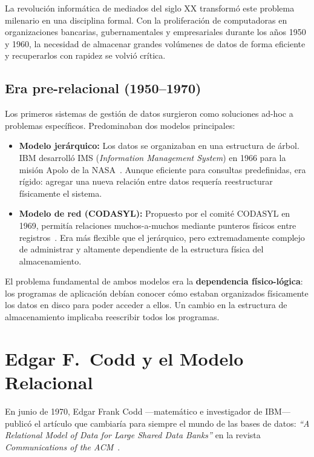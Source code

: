 \documentclass[12pt, a4paper]{article}
\begin{document}
	La revolución informática de mediados del siglo XX transformó este
	problema milenario en una disciplina formal.
	Con la proliferación de computadoras en organizaciones bancarias,
	gubernamentales y empresariales durante los años 1950 y 1960,
	la necesidad de almacenar grandes volúmenes de datos de forma
	eficiente y recuperarlos con rapidez se volvió crítica.
	
	\subsection{Era pre-relacional (1950–1970)}
	
	Los primeros sistemas de gestión de datos surgieron como soluciones
	ad-hoc a problemas específicos.
	Predominaban dos modelos principales:
	
	\begin{itemize}
		\item \textbf{Modelo jerárquico:} Los datos se organizaban en una
		estructura de árbol. IBM desarrolló IMS
		(\textit{Information Management System}) en 1966 para la misión
		Apolo de la NASA~\cite{date2003introduction}.
		Aunque eficiente para consultas predefinidas, era rígido:
		agregar una nueva relación entre datos requería reestructurar
		físicamente el sistema.
		
		\item \textbf{Modelo de red (CODASYL):} Propuesto por el comité
		CODASYL en 1969, permitía relaciones muchos-a-muchos mediante
		punteros físicos entre registros~\cite{codasyl1971}.
		Era más flexible que el jerárquico, pero extremadamente complejo
		de administrar y altamente dependiente de la estructura física
		del almacenamiento.
	\end{itemize}
	
	El problema fundamental de ambos modelos era la
	\textbf{dependencia físico-lógica}: los programas de aplicación
	debían conocer cómo estaban organizados físicamente los datos en
	disco para poder acceder a ellos. Un cambio en la estructura de
	almacenamiento implicaba reescribir todos los programas.
	
	\section{Edgar F.\ Codd y el Modelo Relacional}
	
	En junio de 1970, Edgar Frank Codd —matemático e investigador
	de IBM— publicó el artículo que cambiaría para siempre el mundo de
	las bases de datos:
	\textit{``A Relational Model of Data for Large Shared Data Banks''}
	en la revista \textit{Communications of the ACM}~\cite{codd1970}.
	
\end{document}
